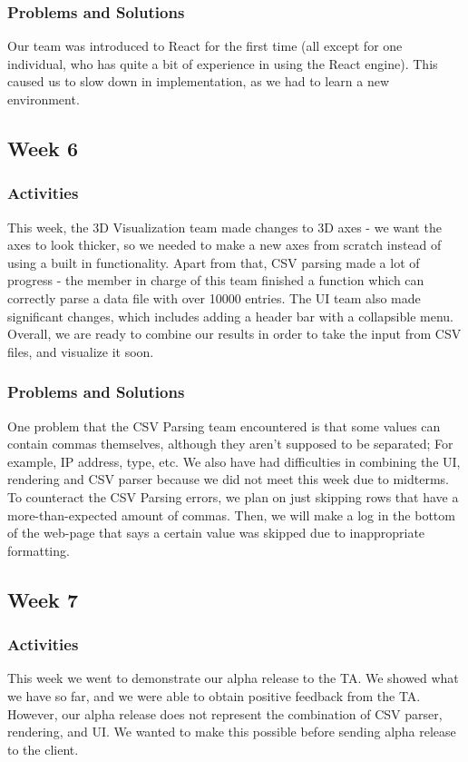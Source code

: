 \documentclass[journal,10pt,onecolumn,compsoc]{IEEEtran} \usepackage[margin=1.0in]{geometry} \usepackage{pdfpages}
\begin{document}
    \subsubsection{Problems and Solutions}
    Our team was introduced to React for the first time (all except for one individual, who has quite a bit of experience in using the React engine). This caused us to slow down in implementation, as we had to learn a new environment. 
 
\subsection{Week 6}
    \subsubsection{Activities}
    This week, the  3D Visualization team made changes to 3D axes - we want the axes to look thicker, so we needed to make a new axes from scratch instead of using a built in functionality. Apart from that, CSV parsing made a lot of progress - the member in charge of this team finished a function which can correctly parse a data file with over 10000 entries. The UI team also made significant changes, which includes adding a header bar with a collapsible menu. Overall, we are ready to combine our results in order to take the input from CSV files, and visualize it soon.
    \subsubsection{Problems and Solutions}
    One problem that the CSV Parsing team encountered is that some values can contain commas themselves, although they aren't supposed to be separated; For example, IP address, type, etc. We also have had difficulties in combining the UI, rendering and CSV parser because we did not meet this week due to midterms. To counteract the CSV Parsing errors, we plan on just skipping rows that have a  more-than-expected amount of commas. Then, we will make a log in the bottom of the web-page that says a certain value was skipped due to inappropriate formatting. 
    
\subsection{Week 7}
    \subsubsection{Activities}
    This week we went to demonstrate our alpha release to the TA. We showed what we have so far, and we were able to obtain positive feedback from the TA. However, our alpha release does not represent the combination of CSV parser, rendering, and UI. We wanted to make this possible before sending alpha release to the client.
\end{document}
